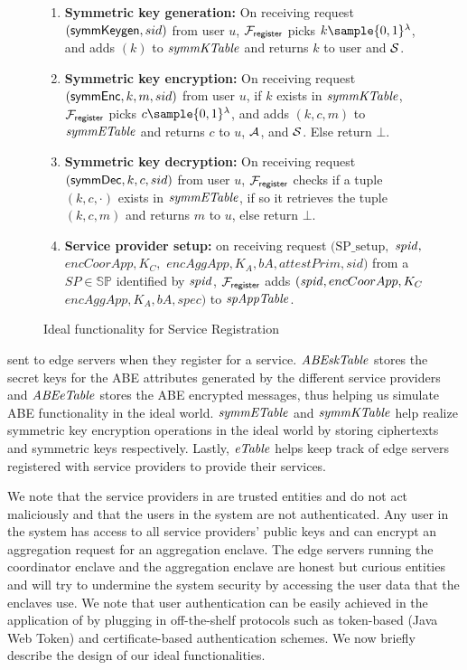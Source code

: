 \begin{figure}[H]
\begin{mdframed}
\begin{enumerate}
\item \textbf{Symmetric key generation:} On receiving request $(\mathsf{symmKeygen},sid)$ from user $u$, $\mathcal{F}_{\mathsf{register}}$ picks $k \sample \{0,1\}^{\lambda}$, and adds  $(k)$ to $\mathit{symmKTable}$ and returns $k$ to user and $\mathcal{S}$. %

\item \textbf{Symmetric key encryption:} On receiving request $(\mathsf{symmEnc},k,m,sid)$ from user $u$, if $k$  exists in $\mathit{symmKTable}$, $\mathcal{F}_{\mathsf{register}}$ picks $c \sample \{0,1\}^{\lambda}$, and adds  $(k,c,m)$ to $\mathit{symmETable}$ and returns $c$ to $u$, $\mathcal{A}$, and $\mathcal{S}$. Else return $\bot$. %

\item \textbf{Symmetric key decryption:} On receiving request $(\mathsf{symmDec},k,c,sid)$ from user $u$,  $\mathcal{F}_{\mathsf{register}}$ checks if a tuple $(k,c,\cdot)$ exists in $\mathit{symmETable}$, if so it retrieves the tuple $(k,c,m)$ and returns $m$ to $u$, else return $\bot$.%

\item \textbf{Service provider setup:} on receiving request $(\mathrm{SP\_setup},$ $\mathit{spid},$ $encCoorApp,K_C,$  $encAggApp,K_A,$$bA, attestPrim,sid)$ from a $SP \in \mathbb{SP}$ identified by $\mathit{spid}$, $\mathcal{F}_{\mathsf{register}}$ adds $(\mathit{spid}, encCoorApp, K_C$ $encAggApp, K_A,bA, spec)$ to $\mathit{spAppTable}$.

\end{enumerate}


\end{mdframed}
\vspace{-0.15in}
\caption{Ideal functionality for Service Registration}
\label{fig:ucregister1}
\end{figure}


\noindent sent to edge servers when they register for a service. $\mathit{ABEskTable}$ stores the secret keys for the ABE attributes generated by the different service providers and $\mathit{ABEeTable}$ stores the ABE encrypted messages, thus helping us simulate ABE functionality in the ideal world. $\mathit{symmETable}$ and $\mathit{symmKTable}$ help realize symmetric key encryption operations in the ideal world by storing ciphertexts and symmetric keys respectively.  %
Lastly, $\mathit{eTable}$ helps keep track of edge servers registered with service providers to provide their services.

We note that the service providers in \sysname are trusted entities and do not act maliciously and that the users in the system are not authenticated. Any user in the system has access to all service providers' public keys and can encrypt an aggregation request for an aggregation enclave. The edge servers running the coordinator enclave and the aggregation enclave are honest but curious entities and will try to undermine the system security by accessing the user data that the enclaves use. We note that user authentication can be easily achieved in the application of \sysname by plugging in off-the-shelf protocols such as token-based (Java Web Token) and certificate-based authentication schemes.
We now briefly describe the design of our ideal functionalities. 


